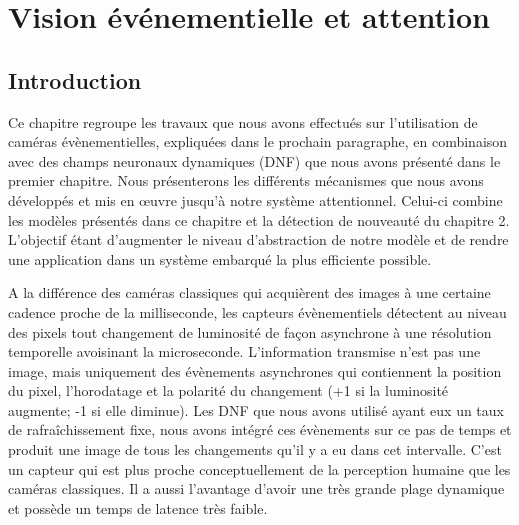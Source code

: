 
\chapter{Vision événementielle et attention}
	\minitoc
	\newpage




	\section{Introduction}

	Ce chapitre regroupe les travaux que nous avons effectués sur l'utilisation de caméras évènementielles, expliquées dans le prochain paragraphe, en combinaison avec des champs neuronaux dynamiques (DNF) que nous avons présenté dans le premier chapitre. Nous présenterons les différents mécanismes que nous avons développés et mis en œuvre jusqu'à notre système attentionnel. Celui-ci combine les modèles présentés dans ce chapitre et la détection de nouveauté du chapitre 2. L'objectif étant  d'augmenter le niveau d'abstraction de notre modèle et de rendre une application dans un système embarqué la plus efficiente possible.

	A la différence des caméras classiques qui acquièrent des images à une certaine cadence proche de la milliseconde, les capteurs évènementiels détectent au niveau des pixels tout changement de luminosité de façon asynchrone à une résolution temporelle avoisinant la microseconde. L'information transmise n'est pas une image, mais uniquement des évènements asynchrones qui contiennent la position du pixel, l'horodatage et la polarité du changement (+1 si la luminosité augmente; -1 si elle diminue). Les DNF que nous avons utilisé ayant eux un taux de rafraîchissement fixe, nous avons intégré ces évènements sur ce pas de temps et produit une image de tous les changements qu'il y a eu dans cet intervalle. C'est un capteur qui est plus proche conceptuellement de la perception humaine que les caméras classiques. Il a aussi l'avantage d'avoir une très grande plage dynamique et possède un temps de latence très faible. \cite{gallego2019event}

